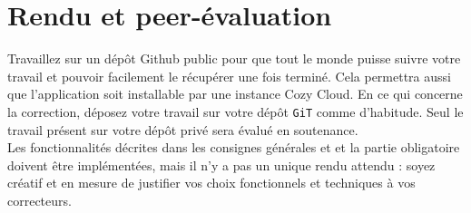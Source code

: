 \documentclass{42-fr}
\begin{document}



\chapter{Rendu et peer-\'evaluation}

	Travaillez sur un d\'ep\^ot Github public pour que tout le monde puisse suivre
	votre travail et pouvoir facilement le récupérer une fois terminé. Cela permettra
	aussi que l'application soit installable par une instance Cozy Cloud.\newline
	En ce qui concerne la correction, d\'eposez votre travail sur votre d\'ep\^ot 
	\texttt{GiT} comme d'habitude.\newline
	Seul le travail pr\'esent sur votre d\'ep\^ot priv\'e sera \'evalu\'e en soutenance.\\
	Les fonctionnalit\'es d\'ecrites dans les consignes g\'en\'erales et et la partie
	obligatoire doivent \^etre impl\'ementées, mais il n'y a pas un unique rendu attendu :
	soyez cr\'eatif et en mesure de justifier vos choix fonctionnels et techniques à vos 
	correcteurs.



\end{document}
